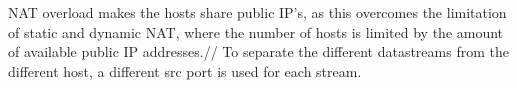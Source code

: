 NAT overload makes the hosts share public IP's, as this overcomes the limitation of static and dynamic NAT, where the number of hosts is limited by the amount of available public IP addresses.//
To separate the different datastreams from the different host, a different src port is used for each stream.